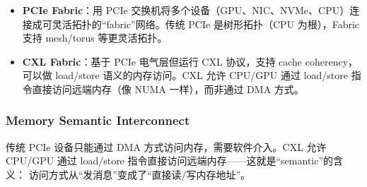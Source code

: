 \begin{itemize}
    \item \textbf{PCIe Fabric}：用 PCIe 交换机将多个设备（GPU、NIC、NVMe、CPU）连接成可灵活拓扑的``fabric''网络。传统 PCIe 是树形拓扑（CPU 为根），Fabric 支持 mesh/torus 等更灵活拓扑。
    \item \textbf{CXL Fabric}：基于 PCIe 电气层但运行 CXL 协议，支持 cache coherency，可以做 load/store 语义的内存访问。CXL 允许 CPU/GPU 通过 load/store 指令直接访问远端内存（像 NUMA 一样），而非通过 DMA 方式。
\end{itemize}

\subsubsection{Memory Semantic Interconnect}

传统 PCIe 设备只能通过 DMA 方式访问内存，需要软件介入。CXL 允许 CPU/GPU 通过
load/store 指令直接访问远端内存——这就是``semantic''的含义：
访问方式从``发消息''变成了``直接读/写内存地址''。

